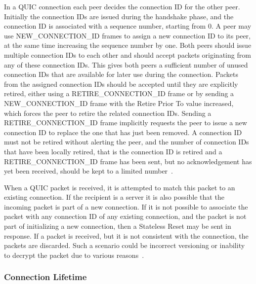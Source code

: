 \documentclass[english, 12pt, a4paper, elec, utf8, a-2b, online]{aaltothesis}
\begin{document}
In a QUIC connection each peer decides the connection ID for the other peer. Initially
the connection IDs are issued during the handshake phase, and the connection ID is
associated with a sequence number, starting from 0. A peer may use NEW\_CONNECTION\_ID frames
to assign a new connection ID to its peer, at the same time increasing the sequence
number by one. Both peers should issue multiple connection IDs to each other
and should accept packets originating from any of these connection IDs. This gives both peers
a sufficient number of unused connection IDs that are available for later use during
the connection. Packets from the assigned connection IDs should be accepted until
they are explicitly retired, either using a RETIRE\_CONNECTION\_ID frame or by
sending a NEW\_CONNECTION\_ID frame with the Retire Prior To value increased, which
forces the peer to retire the related connection IDs. Sending a RETIRE\_CONNECTION\_ID
frame implicitly requests the peer to issue a new connection ID to replace the one
that has just been removed. A connection ID must not be retired without alerting the peer,
and the number of connection IDs that have been locally retired, that is the connection
ID is retired and a RETIRE\_CONNECTION\_ID frame has been sent, but no acknowledgement
has yet been received, should be kept to a limited number~\cite{rfc9000}.

When a QUIC packet is received, it is attempted to match this packet to an existing
connection. If the recipient is a server it is also possible that the incoming
packet is part of a new connection. If it is not possible to associate the packet
with any connection ID of any existing connection, and the packet is not part of
initializing a new connection, then a Stateless Reset may be sent in response. If
a packet is received, but it is not consistent with the connection, the packets
are discarded. Such a scenario could be incorrect versioning or inability to
decrypt the packet due to various reasons~\cite{rfc9000}.

\subsubsection{Connection Lifetime}
\end{document}
